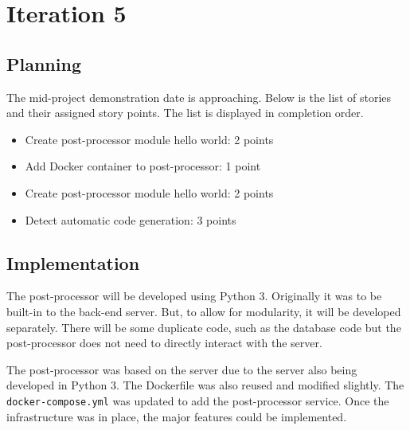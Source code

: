 \chapter{Iteration 5}
\section{Planning}
The mid-project demonstration date is approaching. Below is the list of stories and their assigned story points. The list is displayed in completion order.

\begin{itemize}
\item Create post-processor module hello world: 2 points
\item Add Docker container to post-processor: 1 point
\item Create post-processor module hello world: 2 points
\item Detect automatic code generation: 3 points
\end{itemize}

\section{Implementation}
The post-processor will be developed using Python 3. Originally it was to be built-in to the back-end server. But, to allow for modularity, it will be developed separately. There will be some duplicate code, such as the database code but the post-processor does not need to directly interact with the server.

The post-processor was based on the server due to the server also being developed in Python 3. The Dockerfile was also reused and modified slightly. The \texttt{docker-compose.yml} was updated to add the post-processor service. Once the infrastructure was in place, the major features could be implemented.

